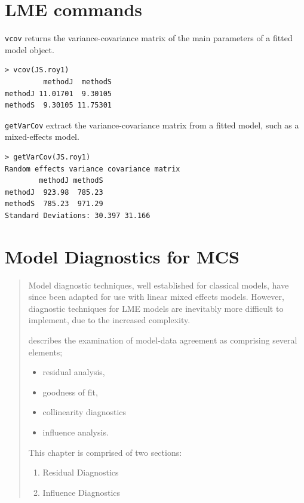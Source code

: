 \documentclass[Main.tex]{subfiles}
\begin{document}
\tableofcontents
\newpage	
\chapter{LME commands}

\texttt{vcov} returns the variance-covariance matrix of the main parameters of a fitted model object.
\begin{framed}
	\begin{verbatim}
> vcov(JS.roy1)
         methodJ  methodS
methodJ 11.01701  9.30105
methodS  9.30105 11.75301
\end{verbatim}
\end{framed}

\texttt{getVarCov} extract the variance-covariance matrix from a fitted model, such as a mixed-effects model.
\begin{framed}
\begin{verbatim}
> getVarCov(JS.roy1)
Random effects variance covariance matrix
        methodJ methodS
methodJ  923.98  785.23
methodS  785.23  971.29
Standard Deviations: 30.397 31.166 
\end{verbatim}
\end{framed}	
	
\chapter{Model Diagnostics for MCS}

\begin{abstract}
Model diagnostic techniques, well established for classical models, have since been adapted for use with linear mixed effects models. However, diagnostic techniques for LME models are inevitably more difficult to implement, due to the increased complexity. \\ \bigskip


\citet{schab} describes the examination of model-data agreement as comprising several elements; \begin{itemize}
		\item residual analysis, 
		\item goodness of fit, 
		\item collinearity diagnostics
		\item influence analysis.
	\end{itemize} 
	
This chapter is comprised of two sections:
\begin{enumerate}
	\item Residual Diagnostics
	\item Influence Diagnostics
\end{enumerate}
\end{abstract}
\end{document}
